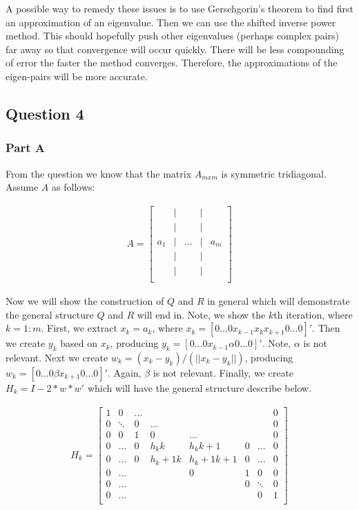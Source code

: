 A possible way to remedy these issues is to use Gerschgorin's theorem to find first an approximation of an eigenvalue.
Then we can use the shifted inverse power method.
This should hopefully push other eigenvalues (perhaps complex pairs) far away so that convergence will occur quickly.
There will be less compounding of error the faster the method converges.
Therefore, the approximations of the eigen-pairs will be more accurate.

\newpage
\subsection{Question 4}
\subsubsection{Part A}

From the question we know that the matrix \(A_{mxm}\) is symmetric tridiagonal.
Assume \(A\) as follows:

\begin{eqnarray}
  A = 
  \begin{bmatrix}
    & | & & | \\
    & | & & | \\
    a_1 & | & \dots & | & a_m \\
    & | & & | \\
    & | & & | \\
  \end{bmatrix}
\end{eqnarray}

Now we will show the construction of \(Q\) and \(R\) in general which will demonstrate the general structure \(Q\) and \(R\) will end in.
Note, we show the \(k\)th iteration, where \(k=1:m\).
First, we extract \(x_k = a_k\), where \(x_k = [0 \dots 0 x_{k-1} x_k x_{k+1} 0 \dots 0]'\).
Then we create \(y_k\) based on \(x_k\), producing \(y_k = [0 \dots 0 x_{k-1} \alpha 0 \dots 0]'\).
Note, \(\alpha\) is not relevant.
Next we create \(w_k = (x_k-y_k)/(||x_k-y_k||)\), producing \(w_k = [0 \dots 0 \beta x_{k+1} 0 \dots 0]'\).
Again, \(\beta\) is not relevant.
Finally, we create \(H_k = I-2*w*w'\) which will have the general structure describe below.

\begin{eqnarray}
  H_k = 
  \begin{bmatrix}
    1 & 0 & \dots & & & & & 0 \\
    0 & \ddots & 0 & \dots & & & & 0 \\
    0 & 0 & 1 & 0 & \dots &  &  & 0 \\
    0 & \dots & 0 & h_kk & h_kk+1 & 0 & \dots & 0\\
    0 & \dots & 0 & h_k+1k & h_k+1k+1 & 0 & \dots & 0 \\
    0 & \dots &  &  & 0 & 1 & 0 & 0 \\
    0 & \dots &  &  &  & 0 & \ddots & 0 \\
    0 & \dots &  &  &  & & 0 &1 \\
  \end{bmatrix}
\end{eqnarray}

